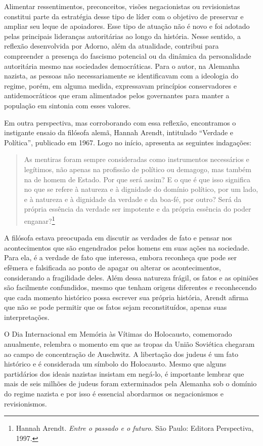 Alimentar ressentimentos, preconceitos, visões negacionistas ou
revisionistas constitui parte da estratégia desse tipo de líder com o
objetivo de preservar e ampliar seu leque de apoiadores. Esse tipo de
atuação não é novo e foi adotado pelas principais lideranças
autoritárias ao longo da história. Nesse sentido, a reflexão
desenvolvida por Adorno, além da atualidade, contribui para compreender a
presença do fascismo potencial ou da dinâmica da personalidade
autoritária mesmo nas sociedades democráticas. Para o autor, na Alemanha
nazista, as pessoas não necessariamente se identificavam com a ideologia
do regime, porém, em alguma medida, expressavam princípios conservadores
e antidemocráticos que eram alimentados pelos governantes para manter a
população em sintonia com esses valores.

Em outra perspectiva, mas corroborando com essa reflexão, encontramos o
instigante ensaio da filósofa alemã, Hannah Arendt, intitulado ``Verdade e
Política'', publicado em 1967. Logo no início, apresenta as seguintes
indagações:

\begin{quote}
As mentiras foram sempre consideradas como instrumentos necessários e
legítimos, não apenas na profissão de político ou demagogo, mas também
na de homem de Estado. Por que será assim? E o que é que isso significa
no que se refere à natureza e à dignidade do domínio político, por um
lado, e à natureza e à dignidade da verdade e da boa-fé, por outro? Será
da própria essência da verdade ser impotente e da própria essência do
poder enganar?\footnote{Hannah Arendt. \textit{Entre o passado e o futuro}. São Paulo: Editora Perspectiva, 1997.}
\end{quote}

A filósofa estava preocupada em discutir as verdades de fato e pensar
nos acontecimentos que são engendrados pelos homens em suas ações na
sociedade. Para ela, é a verdade de fato que interessa, embora reconheça
que pode ser efêmera e falsificada ao ponto de apagar ou alterar os
acontecimentos, considerando a fragilidade deles. Além dessa natureza
frágil, os fatos e as opiniões são facilmente confundidos, mesmo que
tenham origens diferentes e reconhecendo que cada momento histórico
possa escrever sua própria história, Arendt afirma que não se pode
permitir que os fatos sejam reconstituídos, apenas suas interpretações.

O Dia Internacional em Memória às Vítimas do Holocausto, comemorado
anualmente, relembra o momento em que as tropas da União Soviética
chegaram ao campo de concentração de Auschwitz. A libertação dos judeus
é um fato histórico e é considerada um símbolo do Holocausto. Mesmo que alguns 
partidários dos ideais nazistas insistam em negá-lo, é
importante lembrar que mais de seis milhões de judeus foram exterminados
pela Alemanha sob o domínio do regime nazista e por isso é essencial
abordarmos os negacionismos e revisionismos.

